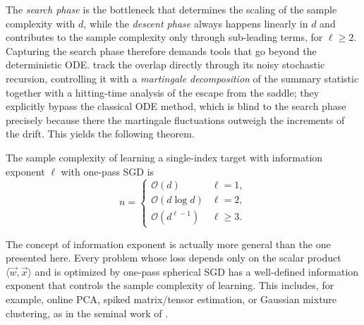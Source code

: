 The \emph{search phase} is the bottleneck that determines the scaling of the sample complexity with \(d\), while the \emph{descent phase} always happens linearly in \(d\) and contributes to the sample complexity only through sub-leading terms, for \(\ell \geq 2\). 
Capturing the search phase therefore demands tools that go beyond the deterministic ODE. \citet{arous2021online} track the overlap directly through its noisy stochastic recursion, controlling it with a \emph{martingale decomposition} of the summary statistic together with a hitting-time analysis of the escape from the saddle; they explicitly bypass the classical ODE method, which is blind to the search phase precisely because there the martingale fluctuations outweigh the increments of the drift. This yields the following theorem.
\begin{theorem}
    The sample complexity of learning a single-index target with information exponent \(\ell\) with one-pass SGD is
    \begin{equation} \label{eq:intro:sgd-sample-complexity}
        n = \begin{cases}
            \mathcal{O}(d) & \ell = 1, \\
            \mathcal{O}(d\log d) & \ell = 2, \\
            \mathcal{O}(d^{\ell - 1}) & \ell \geq 3.
        \end{cases}
    \end{equation}
\end{theorem}

The concept of information exponent is actually more general than the one presented here. Every problem whose loss depends only on the scalar product \(\langle \vec{w}, \vec{x}\rangle\) and is optimized by one-pass spherical SGD has a well-defined information exponent that controls the sample complexity of learning. This includes, for example, online PCA, spiked matrix/tensor estimation, or Gaussian mixture clustering, as in the seminal work of \citet{arous2021online}.


